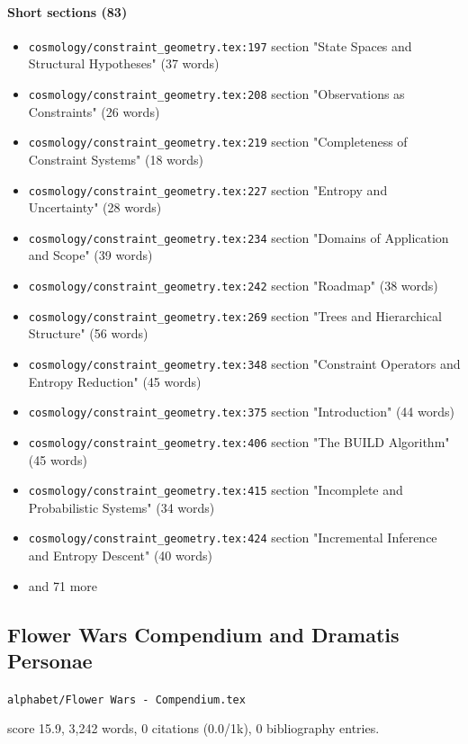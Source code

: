 \documentclass[11pt]{article}
\newcommand{\loc}[1]{{\small\color{muted}\texttt{#1}}}
\begin{document}
\paragraph{Short sections (83)}
\begin{itemize}
\item \loc{cosmology/\allowbreak{}constraint\_geometry.tex:197} section "State Spaces and Structural Hypotheses" (37 words)
\item \loc{cosmology/\allowbreak{}constraint\_geometry.tex:208} section "Observations as Constraints" (26 words)
\item \loc{cosmology/\allowbreak{}constraint\_geometry.tex:219} section "Completeness of Constraint Systems" (18 words)
\item \loc{cosmology/\allowbreak{}constraint\_geometry.tex:227} section "Entropy and Uncertainty" (28 words)
\item \loc{cosmology/\allowbreak{}constraint\_geometry.tex:234} section "Domains of Application and Scope" (39 words)
\item \loc{cosmology/\allowbreak{}constraint\_geometry.tex:242} section "Roadmap" (38 words)
\item \loc{cosmology/\allowbreak{}constraint\_geometry.tex:269} section "Trees and Hierarchical Structure" (56 words)
\item \loc{cosmology/\allowbreak{}constraint\_geometry.tex:348} section "Constraint Operators and Entropy Reduction" (45 words)
\item \loc{cosmology/\allowbreak{}constraint\_geometry.tex:375} section "Introduction" (44 words)
\item \loc{cosmology/\allowbreak{}constraint\_geometry.tex:406} section "The BUILD Algorithm" (45 words)
\item \loc{cosmology/\allowbreak{}constraint\_geometry.tex:415} section "Incomplete and Probabilistic Systems" (34 words)
\item \loc{cosmology/\allowbreak{}constraint\_geometry.tex:424} section "Incremental Inference and Entropy Descent" (40 words)
\item[] {\color{muted}\small and 71 more}
\end{itemize}
\subsection{Flower Wars Compendium and Dramatis Personae}
\loc{alphabet/\allowbreak{}Flower Wars - Compendium.tex}\par
score 15.9, 3,242 words, 0 citations (0.0/1k), 0 bibliography entries.
\end{document}
